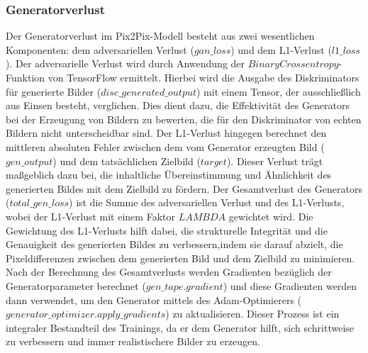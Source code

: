 \subsubsection{Generatorverlust}
Der Generatorverlust im Pix2Pix-Modell besteht aus zwei wesentlichen Komponenten: dem adversariellen Verlust ($gan\_loss$) und dem L1-Verlust ($l1\_loss$). Der adversarielle Verlust wird durch Anwendung der $BinaryCrossentropy$-Funktion von TensorFlow ermittelt. Hierbei wird die Ausgabe des Diskriminators für generierte Bilder ($disc\_generated\_output$) mit einem Tensor, der ausschließlich aus Einsen besteht, verglichen. Dies dient dazu, die Effektivität des Generators bei der Erzeugung von Bildern zu bewerten, die für den Diskriminator von echten Bildern nicht unterscheidbar sind. Der L1-Verlust hingegen berechnet den mittleren absoluten Fehler zwischen dem vom Generator erzeugten Bild ($gen\_output$) und dem tatsächlichen Zielbild ($target$). Dieser Verlust trägt maßgeblich dazu bei, die inhaltliche Übereinstimmung und Ähnlichkeit des generierten Bildes mit dem Zielbild zu fördern. \newline
Der Gesamtverlust des Generators ($total\_gen\_loss$) ist die Summe des adversariellen Verlust und des L1-Verlusts, wobei der L1-Verlust mit einem Faktor $LAMBDA$ gewichtet wird. Die Gewichtung des L1-Verlusts hilft dabei, die strukturelle Integrität und die Genauigkeit des generierten Bildes zu verbessern,indem sie darauf abzielt, die Pixeldifferenzen zwischen dem generierten Bild und dem Zielbild zu minimieren.\newline
Nach der Berechnung des Gesamtverlusts werden Gradienten bezüglich der Generatorparameter berechnet ($gen\_tape.gradient$) und diese Gradienten werden dann verwendet, um den Generator mittels des Adam-Optimierers ($generator\_optimizer.apply\_gradients$) zu aktualisieren. Dieser Prozess ist ein integraler Bestandteil des Trainings, da er dem Generator hilft, sich schrittweise zu verbessern und immer realistischere Bilder zu erzeugen.

